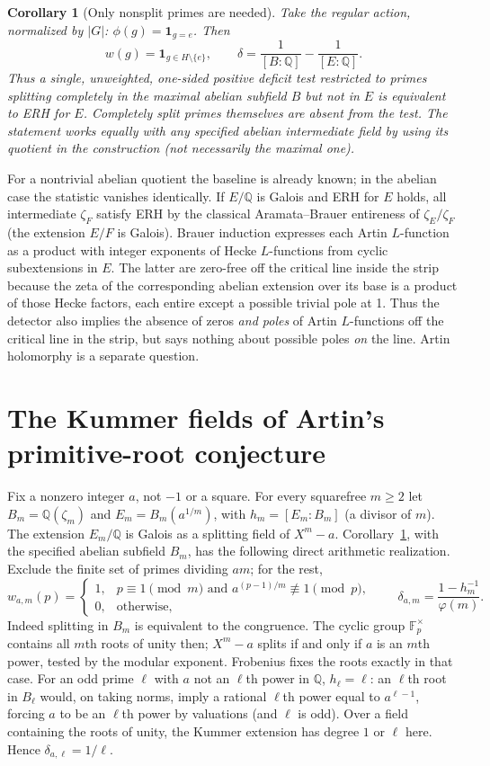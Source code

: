 \documentclass[11pt]{article}
\newtheorem{corollary}[theorem]{Corollary}
\theoremstyle{definition}\newtheorem{definition}[theorem]{Definition}
\newcommand{\Q}{\mathbb Q}\newcommand{\C}{\mathbb C}\newcommand{\R}{\mathbb R}\newcommand{\Rea}{\operatorname{Re}}\newcommand{\Frob}{\operatorname{Frob}}\newcommand{\Gal}{\operatorname{Gal}}\newcommand{\pos}[1]{\left(#1\right)_+}
\begin{document}
\begin{corollary}[Only nonsplit primes are needed]\label{split}
Take the regular action, normalized by $|G|$: $\phi(g)=\mathbf 1_{g=e}$. Then
\[
 w(g)=\mathbf 1_{g\in H\setminus\{e\}},\qquad
 \delta=\frac{1}{[B:\Q]}-\frac{1}{[E:\Q]}.
\]
Thus a single, unweighted, one-sided positive deficit test restricted to primes splitting completely in the maximal abelian subfield $B$ but not in $E$ is equivalent to ERH for $E$. Completely split primes themselves are absent from the test. The statement works equally with any specified abelian intermediate field by using its quotient in the construction (not necessarily the maximal one).
\end{corollary}
For a nontrivial abelian quotient the baseline is already known; in the abelian case the statistic vanishes identically. If $E/\Q$ is Galois and ERH for $E$ holds, all intermediate $\zeta_F$ satisfy ERH by the classical Aramata--Brauer entireness of $\zeta_E/\zeta_F$ (the extension $E/F$ is Galois). Brauer induction expresses each Artin $L$-function as a product with integer exponents of Hecke $L$-functions from cyclic subextensions in $E$. The latter are zero-free off the critical line inside the strip because the zeta of the corresponding abelian extension over its base is a product of those Hecke factors, each entire except a possible trivial pole at 1. Thus the detector also implies the absence of zeros \emph{and poles} of Artin $L$-functions off the critical line in the strip, but says nothing about possible poles \emph{on} the line. Artin holomorphy is a separate question.

\section{The Kummer fields of Artin's primitive-root conjecture}
Fix a nonzero integer $a$, not $-1$ or a square. For every squarefree $m\ge2$ let $B_m=\Q(\zeta_m)$ and $E_m=B_m(a^{1/m})$, with $h_m=[E_m:B_m]$ (a divisor of $m$). The extension $E_m/\Q$ is Galois as a splitting field of $X^m-a$. Corollary~\ref{split}, with the specified abelian subfield $B_m$, has the following direct arithmetic realization. Exclude the finite set of primes dividing $am$; for the rest,
\[
 w_{a,m}(p)=\begin{cases}
  1,&p\equiv1\pmod m\text{ and } a^{(p-1)/m}\not\equiv1\pmod p,\\
  0,&\text{otherwise},
 \end{cases}\qquad
 \delta_{a,m}=\frac{1-h_m^{-1}}{\varphi(m)}.
\]
Indeed splitting in $B_m$ is equivalent to the congruence. The cyclic group $\mathbb F_p^\times$ contains all $m$th roots of unity then; $X^m-a$ splits if and only if $a$ is an $m$th power, tested by the modular exponent. Frobenius fixes the roots exactly in that case. For an odd prime $\ell$ with $a$ not an $\ell$th power in $\Q$, $h_\ell=\ell$: an $\ell$th root in $B_\ell$ would, on taking norms, imply a rational $\ell$th power equal to $a^{\ell-1}$, forcing $a$ to be an $\ell$th power by valuations (and $\ell$ is odd). Over a field containing the roots of unity, the Kummer extension has degree $1$ or $\ell$ here. Hence $\delta_{a,\ell}=1/\ell$.
\end{document}
